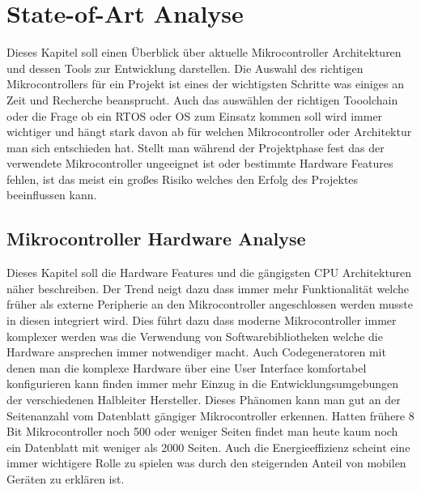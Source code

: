 \documentclass[MES,Master,ngerman]{twbook}%
\begin{document}
{{{    \newcommand{\citefigm}[2]{(Source: taken with modification from \protect\cite{#1}, p. #2)}%
    \newcommand{\citep}{\citeasnoun}%
    \newcommand{\acessedthrough}{Available at:}%
    \newcommand{\acessedthroughp}{Available through:}%
    \newcommand{\acessedat}{Accessed}%
    \newcommand{\singlepage}{p.}%
    \newcommand{\multiplepages}{pp.}%
    \newcommand{\chapternr}{Ch.}%
    \renewcommand{\harvardand}{\&}%
    \newcommand{\abstractonly}{Abstract only}
    \newcommand{\edition}{~edition}%
}}}

\maketitle


%
%
\chapter{State-of-Art Analyse}
Dieses Kapitel soll einen Überblick über aktuelle Mikrocontroller Architekturen und dessen Tools zur Entwicklung darstellen. Die Auswahl des richtigen Mikrocontrollers für ein Projekt ist eines der wichtigsten Schritte was einiges an Zeit und Recherche beansprucht. Auch das auswählen der richtigen Tooolchain oder die Frage ob ein RTOS oder OS zum Einsatz kommen soll wird immer wichtiger und hängt stark davon ab für welchen Mikrocontroller oder Architektur man sich entschieden hat. Stellt man während der Projektphase fest das der verwendete Mikrocontroller ungeeignet ist oder bestimmte Hardware Features fehlen, ist das meist ein großes Risiko welches den Erfolg des Projektes beeinflussen kann.  
\section{Mikrocontroller Hardware Analyse}
Dieses Kapitel soll die Hardware Features und die gängigsten CPU Architekturen näher beschreiben. Der Trend neigt dazu dass immer mehr Funktionalität welche früher als externe Peripherie an den Mikrocontroller angeschlossen werden musste in diesen integriert wird. Dies führt dazu dass moderne Mikrocontroller immer komplexer werden was die Verwendung von Softwarebibliotheken welche die Hardware ansprechen immer notwendiger macht. Auch Codegeneratoren mit denen man die komplexe Hardware über eine User Interface komfortabel konfigurieren kann finden immer mehr Einzug in die Entwicklungsumgebungen der verschiedenen Halbleiter Hersteller. Dieses Phänomen kann man gut an der Seitenanzahl vom Datenblatt gängiger Mikrocontroller erkennen. Hatten frühere 8 Bit Mikrocontroller noch 500 oder weniger Seiten findet man heute kaum noch ein Datenblatt mit weniger als 2000 Seiten. Auch die Energieeffizienz scheint eine immer wichtigere Rolle zu spielen was durch den steigernden Anteil von mobilen Geräten zu erklären ist. 
\end{document}
